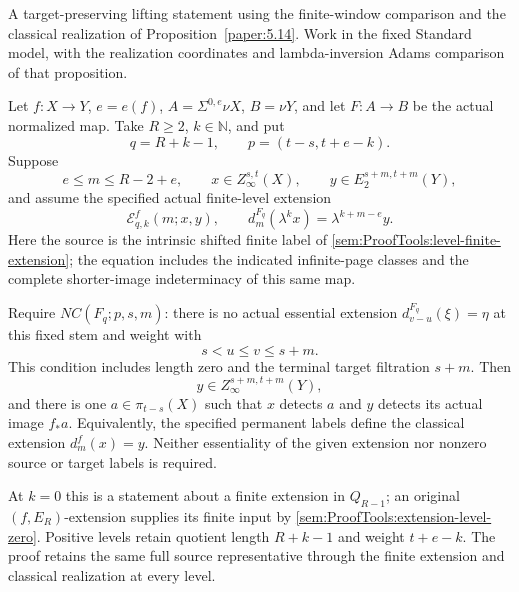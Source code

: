 \begin{proposition}
\label{sem:ProofTools:ss-classical-soundness}
A target-preserving lifting statement using the finite-window
comparison and the classical realization of Proposition~\ref{paper:5.14}.
Work in the fixed Standard model, with the realization coordinates
and lambda-inversion Adams comparison of that proposition.

Let $f:X\to Y$, $e=e(f)$, $A=\Sigma^{0,e}\nu X$, $B=\nu Y$,
and let $F:A\to B$ be the actual normalized map. Take $R\ge2$,
$k\in\mathbb N$, and put
\[
q=R+k-1,\qquad p=(t-s,t+e-k).
\]
Suppose
\[
e\le m\le R-2+e,\qquad
x\in Z_\infty^{s,t}(X),\qquad
y\in E_2^{s+m,t+m}(Y),
\]
and assume the specified actual finite-level extension
\[
\mathcal E^f_{q,k}(m;x,y),\qquad
d_m^{F_q}(\lambda^kx)=\lambda^{k+m-e}y.
\]
Here the source is the intrinsic shifted finite label of
\ref{sem:ProofTools:level-finite-extension}; the equation includes
the indicated infinite-page classes and the complete shorter-image
indeterminacy of this same map.

Require $NC(F_q;p,s,m)$: there is no actual essential extension
$d_{v-u}^{F_q}(\xi)=\eta$ at this fixed stem and weight with
\[
s<u\le v\le s+m.
\]
This condition includes length zero and the terminal target
filtration $s+m$. Then
\[
y\in Z_\infty^{s+m,t+m}(Y),
\]
and there is one $a\in\pi_{t-s}(X)$ such that $x$ detects $a$ and
$y$ detects its actual image $f_*a$. Equivalently, the specified
permanent labels define the classical extension $d_m^f(x)=y$.
Neither essentiality of the given extension nor nonzero source
or target labels is required.

At $k=0$ this is a statement about a finite extension in
$Q_{R-1}$; an original $(f,E_R)$-extension supplies its finite
input by \ref{sem:ProofTools:extension-level-zero}. Positive
levels retain quotient length $R+k-1$ and weight $t+e-k$.
The proof retains the same full source representative through
the finite extension and classical realization at every level.
\end{proposition}
